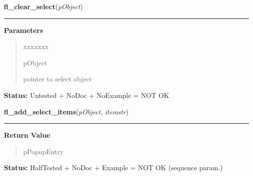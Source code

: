     \label{xformslib:library:fl_clear_select}

    \vspace{0.5ex}

\hspace{.8\funcindent}\begin{boxedminipage}{\funcwidth}

    \raggedright \textbf{fl\_clear\_select}(\textit{pObject})

    \vspace{-1.5ex}

    \rule{\textwidth}{0.5\fboxrule}
\setlength{\parskip}{2ex}
\setlength{\parskip}{1ex}
      \textbf{Parameters}
      \vspace{-1ex}

      \begin{quote}
        \begin{Ventry}{xxxxxxx}

          \item[pObject]

          pointer to select object

        \end{Ventry}

      \end{quote}

\textbf{Status:} Untested + NoDoc + NoExample = NOT OK



    \end{boxedminipage}

    \label{xformslib:library:fl_add_select_items}

    \vspace{0.5ex}

\hspace{.8\funcindent}\begin{boxedminipage}{\funcwidth}

    \raggedright \textbf{fl\_add\_select\_items}(\textit{pObject}, \textit{itemstr})

    \vspace{-1.5ex}

    \rule{\textwidth}{0.5\fboxrule}
\setlength{\parskip}{2ex}
\setlength{\parskip}{1ex}
      \textbf{Return Value}
    \vspace{-1ex}

      \begin{quote}
      pPopupEntry

      \end{quote}

\textbf{Status:} HalfTested + NoDoc + Example = NOT OK (sequence param.)



    \end{boxedminipage}

